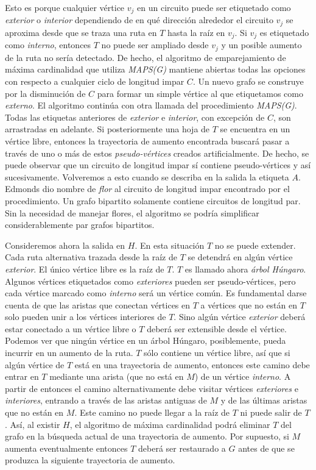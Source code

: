 \documentclass[10pt,a5paper]{book}
\begin{document}
Esto es porque cualquier vértice $v_j$ en un circuito puede ser etiquetado como \emph{exterior} o \emph{interior} dependiendo de en qué dirección alrededor el circuito $v_j$ se aproxima desde que se traza una ruta en $T$ hasta la raíz en $v_j$. Si $v_j$ es etiquetado como \emph{interno}, entonces $T$ no puede ser ampliado desde $v_j$ y un posible aumento de la ruta no sería detectado. De hecho, el algoritmo de emparejamiento de máxima cardinalidad que utiliza \emph{MAPS(G)} mantiene abiertas todas las opciones con respecto a cualquier ciclo de longitud impar $C$. Un nuevo grafo se construye por la disminución de $C$ para formar un simple vértice al que etiquetamos como \emph{externo}. El algoritmo continúa con otra llamada del procedimiento \emph{MAPS(G)}. Todas las etiquetas anteriores de \emph{exterior} e \emph{interior}, con excepción de $C$, son arrastradas en adelante. Si posteriormente una hoja de $T$ se encuentra en un vértice libre, entonces la trayectoria de aumento encontrada buscará pasar a través de uno o más de estos \emph{pseudo-vértices} creados artificialmente. De hecho, se puede observar que un circuito de longitud impar sí contiene pseudo-vértices y así sucesivamente. Volveremos a esto cuando se describa en la salida la etiqueta $A$. Edmonds dio nombre de \emph{flor} al circuito de longitud impar encontrado por el procedimiento. Un grafo bipartito solamente contiene circuitos de longitud par. Sin la necesidad de manejar flores, el algoritmo se podría simplificar considerablemente par grafos bipartitos.

Consideremos ahora la salida en $H$. En esta situación $T$ no se puede extender. Cada ruta alternativa trazada desde la raíz de $T$ se detendrá en algún vértice \emph{exterior}. El único vértice libre es la raíz de $T$. $T$ es llamado ahora \emph{árbol Húngaro}. Algunos vértices etiquetados como \emph{exteriores} pueden ser pseudo-vértices, pero cada vértice marcado como \emph{interno} será un vértice común. Es fundamental darse cuenta de que las aristas que conectan vértices en $T$ a vértices que no están en $T$ solo pueden unir a los vértices interiores de $T$. Sino algún vértice \emph{exterior} deberá estar conectado a un vértice libre o $T$ deberá ser extensible desde el vértice. Podemos ver que ningún vértice en un árbol Húngaro, posiblemente, pueda incurrir en un aumento de la ruta. $T$ sólo contiene un vértice libre, así que si algún vértice de $T$ está en una trayectoria de aumento, entonces este camino debe entrar en $T$ mediante una arista (que no está en $M$) de un vértice \emph{interno}. A partir de entonces el camino alternativamente debe visitar vértices \emph{exteriores} e \emph{interiores}, entrando a través de las aristas antiguas de $M$ y de las últimas aristas que no están en $M$. Este camino no puede llegar a la raíz de $T$ ni puede salir de $T$. Así, al existir $H$, el algoritmo de máxima cardinalidad podrá eliminar $T$ del grafo en la búsqueda actual de una trayectoria de aumento. Por supuesto, si $M$ aumenta eventualmente entonces $T$ deberá ser restaurado a $G$ antes de que se produzca la siguiente trayectoria de aumento.
\end{document}
